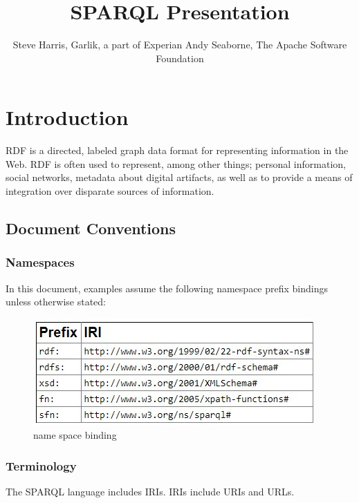 \documentclass[output=paper,
colorlinks,
citecolor=brown,
newtxmath
]{langscibook}
\author{Steve Harris, Garlik, a part of Experian
Andy Seaborne, The Apache Software Foundation\affiliation{W3C}}
\title{SPARQL Presentation}
\begin{document}
\maketitle


\section{Introduction} 
RDF is a directed, labeled graph data format for representing information in the Web. RDF is often used to represent, among other things; personal information, social networks, metadata about digital artifacts, as well as to provide a means of integration over disparate sources of information.
\subsection{Document Conventions}
\subsubsection{Namespaces}
In this document, examples assume the following namespace prefix bindings unless otherwise stated:

\begin{figure}[htp]\centering
\caption{name space binding}
\includegraphics{langsci/img/namespacePrefixBindings.jpg}
\end{figure}

\subsubsection{Terminology}
The SPARQL language includes IRIs. IRIs include URIs and URLs.








\end{document}

